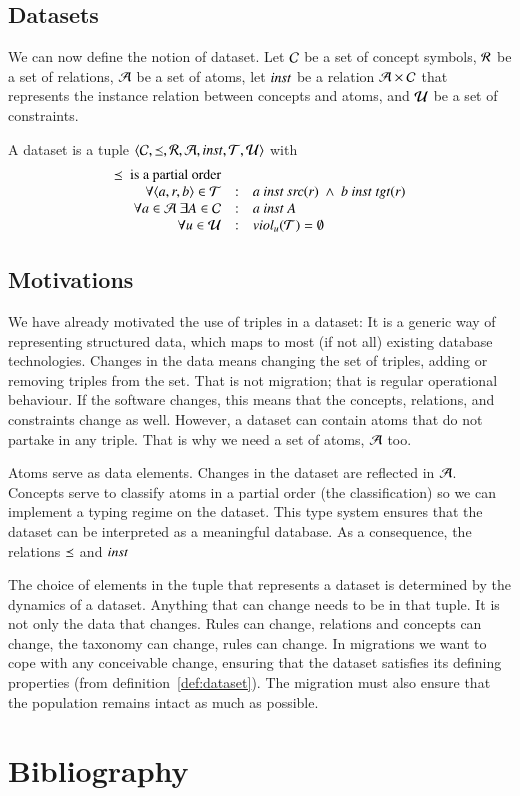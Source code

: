 \documentclass{elsarticle}
\begin{document}
\subsection{Datasets}
	We can now define the notion of dataset.
	Let	$\mathcal{C}$ be a set of concept symbols,
	$\mathcal{R}$ be a set of relations,
	$\mathcal{A}$ be a set of atoms,
	let $\text{\it inst\/}$ be a relation $\mathcal{A}\times\mathcal{C}$ that represents the instance relation between concepts and atoms,
	and $\mathcal{U}$ be a set of constraints.
\begin{definition}[dataset]
	\label{def:dataset}
	\item A dataset is a tuple $\langle\mathcal{C},\preceq,\mathcal{R},\mathcal{A},\text{\it inst\/},\mathcal{T},\mathcal{U}\rangle$ with
	\[\begin{array}[3]{rcl}
		\isa\text{\ is a partial order}\\
		\forall\triple{a}{r}{b}\in\triples&:&a\ \inst\ \src{r}\ \wedge\ b\ \inst\ \tgt{r}\\
		\forall a\in\atoms\ \exists A\in\concepts&:&a\ \inst\ A\\
		\forall u\in\rules&:&\viol{\triples}{u}=\emptyset
	\end{array}\]
\end{definition}

\subsection{Motivations}
	We have already motivated the use of triples in a dataset:
	It is a generic way of representing structured data, which maps to most (if not all) existing database technologies.
	Changes in the data means changing the set of triples, adding or removing triples from the set.
	That is not migration; that is regular operational behaviour.
	If the software changes, this means that the concepts, relations, and constraints change as well.
	However, a dataset can contain atoms that do not partake in any triple.
	That is why we need a set of atoms, $\mathcal{A}$ too.

	Atoms serve as data elements. Changes in the dataset are reflected in $\mathcal{A}$.
	Concepts serve to classify atoms in a partial order (the classification) so we can implement a typing regime on the dataset.
	This type system ensures that the dataset can be interpreted as a meaningful database.
	As a consequence, the relations $\preceq$ and $\text{\it inst\/}$

	The choice of elements in the tuple that represents a dataset is determined by the dynamics of a dataset.
	Anything that can change needs to be in that tuple.
	It is not only the data that changes. Rules can change, relations and concepts can change, the taxonomy can change,
	rules can change.
	In migrations we want to cope with any conceivable change,
	ensuring that the dataset satisfies its defining properties (from definition~\ref{def:dataset}).
	The migration must also ensure that the population remains intact as much as possible.



\section{Bibliography}


\end{document}
